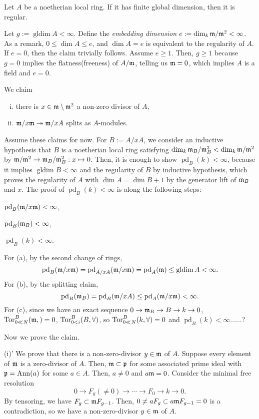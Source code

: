 \documentclass{../../../small}
\renewcommand{\pd}{\operatorname{pd}}
\newcommand{\gldim}{\operatorname{gldim}}
\begin{document}
\begin{thm*}[3.8]
Let $A$ be a noetherian local ring.
If it has finite global dimension, then it is regular.
\end{thm*}
\begin{pf}
Let $g:=\gldim A<\infty$.
Define the \emph{embedding dimension} $e:=\dim_k\mathfrak{m}/\mathfrak{m}^2<\infty$.
As a remark, $0\le\dim A\le e$, and $\dim A=e$ is equivalent to the regularity of $A$.
If $e=0$, then the claim trivially follows.
Assume $e\ge1$.
Then, $g\ge1$ because $g=0$ implies the flatness(freeness) of $A/\mathfrak{m}$, telling us $\mathfrak{m}=0$, which implies $A$ is a field and $e=0$.

We claim
\begin{enumerate}[(i)]
\item there is $x\in\mathfrak{m}\setminus\mathfrak{m}^2$ a non-zero divisor of $A$,
\item $\mathfrak{m}/x\mathfrak{m}\twoheadrightarrow \mathfrak{m}/xA$ splits as $A$-modules.
\end{enumerate}
Assume these claims for now.
For $B:=A/xA$, we consider an inductive hypothesis that $B$ is a noetherian local ring satisfying $\dim_k\mathfrak{m}_B/\mathfrak{m}_B^2<\dim_k\mathfrak{m}/\mathfrak{m}^2$ by $\mathfrak{m}/\mathfrak{m}^2\to\mathfrak{m}_B/\mathfrak{m}_B^2:x\mapsto0$.
Then, it is enough to show $\pd_B(k)<\infty$, because it implies $\gldim B<\infty$ and the regularity of $B$ by inductive hypothesis, which proves the regularity of $A$ with $\dim A=\dim B+1$ by the generator lift of $\mathfrak{m}_B$ and $x$.
The proof of $\pd_B(k)<\infty$ is along the following steps:
\begin{parts}
\item $\pd_B(\fm/x\fm)<\infty$,
\item $\pd_B(\fm_B)<\infty$,
\item $\pd_B(k)<\infty$.
\end{parts}
For (a), by the second change of rings,
\[\pd_B(\fm/x\fm)=\pd_{A/xA}(\fm/x\fm)=\pd_A(\fm)\le\gldim A<\infty.\]
For (b), by the splitting claim,
\[\pd_B(\fm_B)=\pd_B(\fm/xA)\le\pd_A(\fm/x\fm)<\infty.\]
For (c), since we have an exact sequence $0\to\mathfrak{m}_B\to B\to k\to0$, $\operatorname{Tor}_{0\ll N}^B(\mathfrak{m},)=0$, $\operatorname{Tor}_{0<i}^B(B,\forall)$, so $\operatorname{Tor}_{0\ll N}^B(k,\forall)=0$ and $\pd_B(k)<\infty$......?


Now we prove the claim.

(i)' We prove that there is a non-zero-divisor $y\in\mathfrak{m}$ of $A$.
Suppose every element of $\mathfrak{m}$ is a zero-divisor of $A$.
Then, $\mathfrak{m}\subset\mathfrak{p}$ for some associated prime ideal with $\mathfrak{p}=\operatorname{Ann}(a)$ for some $a\in A$.
Then, $a\ne0$ and $a\mathfrak{m}=0$.
Consider the minimal free resolution
\[0\to F_g(\ne0)\to\cdots\to F_0\to k\to0.\]
By tensoring, we have $F_g\subset\mathfrak{m} F_{g-1}$.
Then, $0\ne aF_g\subset a\mathfrak{m} F_{g-1}=0$ is a contradiction, so we have a non-zero-divisor $y\in\mathfrak{m}$ of $A$.


\end{pf}
\end{document}
